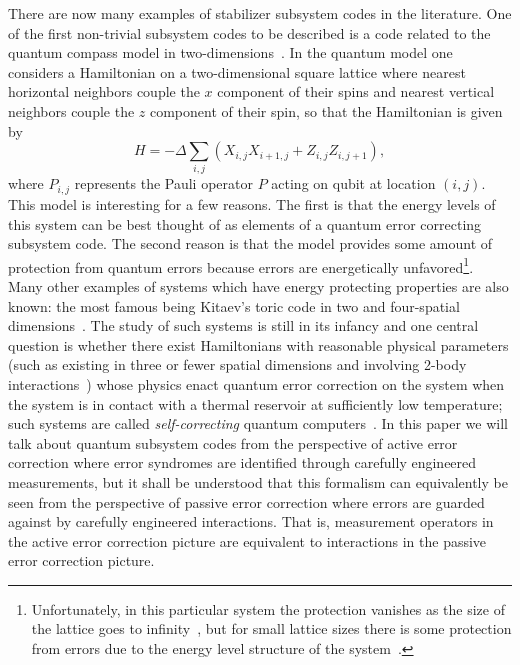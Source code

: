 \documentclass[12pt]{amsbook}
\theoremstyle{plain}
\theoremstyle{definition}
\theoremstyle{remark}
\begin{document}
There are now many examples of stabilizer subsystem codes in the literature.  One of the first non-trivial subsystem codes to be described is a code related to the quantum compass model in two-dimensions~\cite{Bacon:01a,Dorier:05a,Bacon:06a}.  In the quantum model one considers a Hamiltonian on a two-dimensional square lattice where nearest horizontal neighbors couple the $x$ component of their spins and nearest vertical neighbors couple the $z$ component of their spin, so that the Hamiltonian is given by
\begin{equation}
H=-\Delta \sum_{i,j} (X_{i,j} X_{i+1,j} +Z_{i,j} Z_{i,j+1}),
\end{equation}
where $P_{i,j}$ represents the Pauli operator $P$ acting on qubit at location $(i,j)$.  This model is interesting for a few reasons.  The first is that the energy levels of this system can be best thought of as elements of a quantum error correcting subsystem code.  The second reason is that the model provides some amount of protection from quantum errors because errors are energetically unfavored\footnote{Unfortunately, in this particular system the protection vanishes as the size of the lattice goes to infinity~\cite{Dorier:05a}, but for small lattice sizes there is some protection from errors due to the energy level structure of the system~\cite{Bacon:01a}.}.  Many other examples of systems which have energy protecting properties are also known: the most famous being Kitaev's toric code in two and four-spatial dimensions~\cite{Kitaev:97c,Kitaev:03a,Dennis:02a}.  The study of such systems is still in its infancy and one central question is whether there exist Hamiltonians with reasonable physical parameters (such as existing in three or fewer spatial dimensions and involving 2-body interactions~\cite{Bravyi:09a,Bravyi:10b}) whose physics enact quantum error correction on the system when the system is in contact with a thermal reservoir at sufficiently low temperature; such systems are called \emph{self-correcting} quantum computers~\cite{Bacon:06a,Bombin:09a}.  In this paper we will talk about quantum subsystem codes from the perspective of active error correction where error syndromes are identified through carefully engineered measurements, but it shall be understood that this formalism can equivalently be seen from the perspective of passive error correction where errors are guarded against by carefully engineered interactions.  That is, measurement operators in the active error correction picture are equivalent to interactions in the passive error correction picture.
\end{document}
